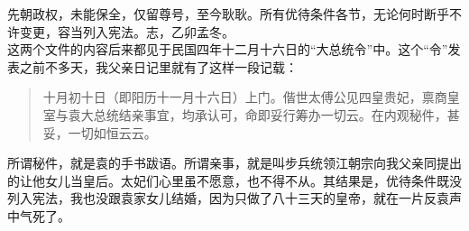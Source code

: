 先朝政权，未能保全，仅留尊号，至今耿耿。所有优待条件各节，无论何时断乎不许变更，容当列入宪法。志，乙卯孟冬。\\

这两个文件的内容后来都见于民国四年十二月十六日的“大总统令”中。这个“令”发表之前不多天，我父亲日记里就有了这样一段记载：\\

\begin{quote}
	十月初十日（即阳历十一月十六日）上门。偕世太傅公见四皇贵妃，禀商皇室与袁大总统结亲事宜，均承认可，命即妥行筹办一切云。在内观秘件，甚妥，一切如恒云云。\\
\end{quote}

所谓秘件，就是袁的手书跋语。所谓亲事，就是叫步兵统领江朝宗向我父亲同提出的让他女儿当皇后。太妃们心里虽不愿意，也不得不从。其结果是，优待条件既没列入宪法，我也没跟袁家女儿结婚，因为只做了八十三天的皇帝，就在一片反袁声中气死了。